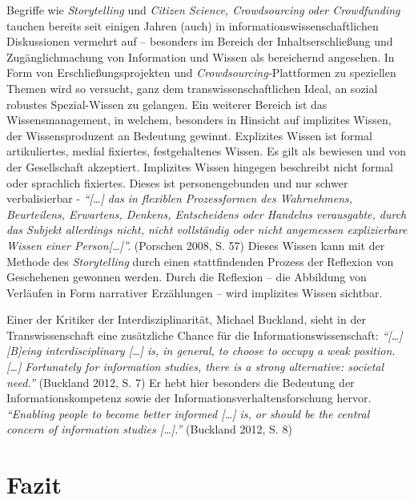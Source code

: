 \documentclass[a4paper,
fontsize=11pt,
oneside,
numbers=noperiodatend,
parskip=half-,
bibliography=totoc,
final
]{scrartcl}
\begin{document}
Begriffe wie \emph{Storytelling} und \emph{Citizen Science,
Crowdsourcing} \emph{oder Crowdfunding} tauchen bereits seit einigen
Jahren (auch) in informationswissenschaftlichen Diskussionen vermehrt
auf -- besonders im Bereich der Inhaltserschließung und
Zugänglichmachung von Information und Wissen als bereichernd angesehen.
In Form von Erschließungsprojekten und \emph{Crowdsourcing-}Plattformen
zu speziellen Themen wird so versucht, ganz dem transwissenschaftlichen
Ideal, an sozial robustes Spezial-Wissen zu gelangen. Ein weiterer
Bereich ist das Wissensmanagement, in welchem, besonders in Hinsicht auf
implizites Wissen, der Wissensproduzent an Bedeutung gewinnt. Explizites
Wissen ist formal artikuliertes, medial fixiertes, festgehaltenes
Wissen. Es gilt als bewiesen und von der Gesellschaft akzeptiert.
Implizites Wissen hingegen beschreibt nicht formal oder sprachlich
fixiertes. Dieses ist personengebunden und nur schwer verbalisierbar -
\emph{\enquote{{[}\ldots{}{]} das in flexiblen Prozessformen des
Wahrnehmens, Beurteilens, Erwartens, Denkens, Entscheidens oder Handelns
verausgabte, durch das Subjekt allerdings nicht, nicht vollständig oder
nicht angemessen explizierbare Wissen einer Person{[}\ldots{}{]}}.}
(Porschen 2008, S. 57) Dieses Wissen kann mit der Methode des
\emph{Storytelling} durch einen stattfindenden Prozess der Reflexion von
Geschehenen gewonnen werden. Durch die Reflexion -- die Abbildung von
Verläufen in Form narrativer Erzählungen -- wird implizites Wissen
sichtbar.

Einer der Kritiker der Interdisziplinarität, Michael Buckland, sieht in
der Transwissenschaft eine zusätzliche Chance für die
Informationswissenschaft: \emph{\enquote{{[}\ldots{}{]} {[}B{]}eing
interdisciplinary {[}\ldots{}{]} is, in general, to choose to occupy a
weak position. {[}\ldots{}{]} Fortunately for information studies, there
is a strong alternative: societal need.}} (Buckland 2012, S. 7) Er hebt
hier besonders die Bedeutung der Informationskompetenz sowie der
Informationsverhaltensforschung hervor. \emph{\enquote{Enabling people
to become better informed {[}\ldots{}{]} is, or should be the central
concern of information studies {[}\ldots{}{]}.}} (Buckland 2012, S. 8)

\section*{Fazit}\label{fazit}
\end{document}
